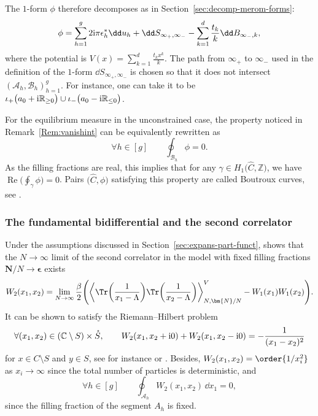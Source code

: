 \documentclass[pdftex]{sigma}
\numberwithin{equation}{section}
\newcommand{\CC}{\mathbb{C}}
\newcommand{\A}{\mathcal{A}}
\begin{document}
The $1$-form $\phi$ therefore decomposes as in Section~\ref{sec:decomp-merom-forms}:
\begin{equation}\label{eq:decomp-omega}
 \phi = \sum_{h=1}^{g} 2{\rm i}\pi\epsilon^{*}_{h}\dd u_{h} + \dd S_{\infty_{+}, \infty_{-}} - \sum_{k=1}^{d}\frac{t_{k}}{k} \dd B_{\infty_{-}, k},
\end{equation}
where the potential is $V(x) = \sum_{k = 1}^{d} \frac{t_kx^k}{k}$. The path from $\infty_+$ to $\infty_-$ used in the definition of the $1$-form $\dd S_{\infty_+,\infty_-}$ is chosen so that it does not intersect $(\mathcal{A}_h,\mathcal{B}_h)_{h = 1}^{g}$. For instance, one can take it to be $\iota_+\bigl(a_0 + {\rm i}\mathbb{R}_{\geq 0}\bigr) \cup \iota_-\bigl(a_0 - {\rm i}\mathbb{R}_{\leq 0}\bigr)$.

\begin{Remark}\label{remB0} For the equilibrium measure in the unconstrained case, the property noticed in Remark~\ref{Rem:vanishint} can be equivalently rewritten as
\[
\forall h \in [g] \qquad \oint_{\mathcal{B}_h} \phi = 0.
\]
As the filling fractions are real, this implies that for any $\gamma \in H_1\bigl(\widehat{C},\mathbb{Z}\bigr)$, we have $\operatorname{Re}\bigl(\oint_{\gamma} \phi\bigr) = 0$. Pairs $\bigl(\widehat{C},\phi\bigr)$ satisfying this property are called Boutroux curves, see \cite{bertola_boutroux_2007}.
\end{Remark}

\subsubsection{The fundamental bidifferential and the second correlator}
\label{sec:second-corr-fund}

Under the assumptions discussed in Section~\ref{sec:expans-part-funct}, \cite{BGmulti} shows that the $N \to \infty$ limit of the second correlator in the model with
fixed filling fractions $\bm{N}/N \rightarrow \bm{\epsilon}$ exists
\begin{equation*}
 W_{2}(x_1,x_2) = \lim_{N \to \infty} \frac{\beta}{2}\Biggl(\bigg\langle\Tr\biggl(\frac{1}{x_1 - \Lambda}\biggr)\Tr\biggl(\frac{1}{x_2 - \Lambda}\biggr)\bigg\rangle^{V}_{N,\bm{N}/N} - W_{1}(x_1)W_{1}(x_2)\Biggr).
\end{equation*}
It can be shown to satisfy the Riemann--Hilbert problem
\begin{equation}
\label{RH2}
 \forall (x_1,x_2) \in (\CC \setminus S) \times \mathring{S},\qquad W_{2}(x_1,x_2 + {\rm i}0) + W_{2}(x_1,x_2 - {\rm i}0) = -\frac{1}{(x_1 - x_2)^{2}}
\end{equation}
for $x \in C\setminus S$ and $y \in S$, see for instance \cite[Chapter
3]{CoursEynard} or \cite{BEO}. Besides, $W_2(x_1,x_2) = \order{1/x_i^2}$ as $x_i \rightarrow \infty$ since the total number of particles is deterministic, and
\begin{equation}
\label{Aw2}
\forall h \in [g]\qquad \oint_{\A_h} W_2(x_1,x_2)\,\dd x_1 = 0,
\end{equation}
since the filling fraction of the segment $A_h$ is fixed.
\end{document}
